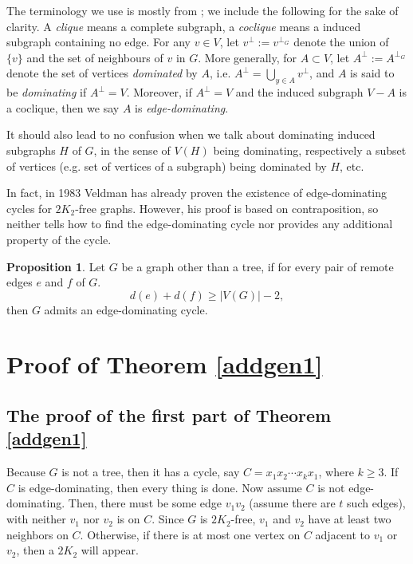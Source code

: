 \documentclass{amsart}
\theoremstyle{definition}
\newtheorem{proposition}{Proposition}
\begin{document}
The terminology we use is  mostly from \cite{bomu08}; we include the following for the sake of
clarity.  
A {\em clique} means a complete subgraph, a {\em coclique} means a
induced subgraph containing no edge. 
For any
$v\in V$, let $v^\perp:=v^{\perp_G}$ denote the union of $\{v\}$ and the set of
neighbours of $v$ in $G$.  More generally, for $A\subset V$, let
$A^\perp:=A^{\perp_G}$ denote the set of vertices {\em dominated} by $A$, i.e.
$A^\perp=\bigcup\limits_{y\in A}v^\perp$, and $A$ is said to be {\em
dominating} if $A^\perp=V$.
Moreover, if $A^{\perp}=V$ and the induced subgraph $V-A$ is a coclique, then we say $A$ is {\em edge-dominating}. 
 
It should also lead to no confusion when we talk
about  dominating induced subgraphs $H$ of $G$, in the sense of $V(H)$ being
dominating, respectively a subset of vertices (e.g. set of vertices of a
subgraph) being dominated by $H$, etc.

In fact, in 1983 Veldman \cite{veldman83} has already proven the existence of edge-dominating cycles for $2K_2$-free graphs. However, his proof is based on contraposition, so neither tells how to find the edge-dominating cycle nor provides any additional property of the cycle.
\begin{proposition}\label{veldman2}{\cite[Theorem 2]{veldman83}}
Let $G$ be a graph other than a tree, if for every pair of remote edges $e$ and $f$ of $G$.
$$d(e)+d(f)\ge|V(G)|-2,$$
then $G$ admits an edge-dominating cycle.
\end{proposition}







\section{Proof of Theorem \ref{addgen1}}

\subsection{The proof of the first part of Theorem \ref{addgen1}}

Because $G$ is not a tree, then it has a cycle, say $C=x_1x_2\cdots x_kx_1$, where $k\ge3$.
If $C$ is edge-dominating, then every thing is done. Now assume $C$ is not edge-dominating. Then, there must be some edge $v_1v_2$ (assume there are $t$ such edges), with neither $v_1$ nor $v_2$ is on $C$. 
Since $G$ is $2K_2$-free, $v_1$ and $v_2$ have at least two neighbors on $C$. Otherwise, if there is at most one vertex on $C$ adjacent to $v_1$ or $v_2$, then a $2K_2$ will appear.
\end{document}

